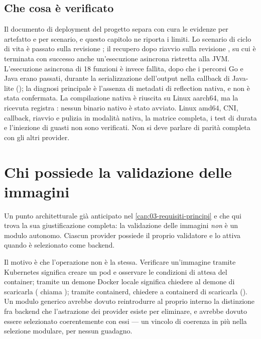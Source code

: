 \subsection{Che cosa \`e verificato}

Il documento di deployment del progetto separa con cura le evidenze per
artefatto e per scenario, e questo capitolo ne riporta i limiti. Lo scenario di
ciclo di vita \`e passato sulla revisione ; il recupero dopo
riavvio sulla revisione , su cui \`e terminata con successo anche
un'esecuzione asincrona ristretta alla JVM. L'esecuzione asincrona di 18
funzioni \`e invece fallita, dopo che i percorsi Go e Java erano passati, durante la
serializzazione dell'output nella callback di Java-lite
(); la diagnosi principale \`e l'assenza di
metadati di reflection nativa, e non \`e stata confermata. La compilazione
nativa \`e riuscita su Linux aarch64, ma la ricevuta registra
: nessun binario nativo \`e stato avviato.
Linux amd64, CNI, callback, riavvio e pulizia in modalit\`a nativa, la matrice
completa, i test di durata e l'iniezione di guasti non sono verificati. Non si
deve parlare di parit\`a completa con gli altri provider.

\section{Chi possiede la validazione delle immagini}

Un punto architetturale gi\`a anticipato nel \cref{cap:03-requisiti-principi} e
che qui trova la sua giustificazione completa: la validazione delle immagini
\emph{non} \`e un modulo autonomo. Ciascun provider possiede il proprio
validatore e lo attiva quando \`e selezionato come backend.

Il motivo \`e che l'operazione non \`e la stessa. Verificare un'immagine tramite
Kubernetes significa creare un pod e osservare le condizioni di attesa del
container; tramite un demone Docker locale significa chiedere al demone di
scaricarla ( chiama ); tramite
containerd, chiedere a containerd di scaricarla ().
Un modulo generico avrebbe dovuto
reintrodurre al proprio interno la distinzione fra backend che l'astrazione dei
provider esiste per eliminare, e avrebbe dovuto essere selezionato
coerentemente con essi --- un vincolo di coerenza in pi\`u nella selezione
modulare, per nessun guadagno.

